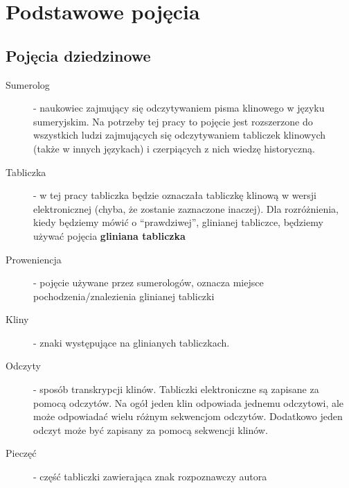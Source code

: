 \chapter{Podstawowe pojęcia}\label{r:pojecia}
\section{Pojęcia dziedzinowe}
\begin{description}
 \item[Sumerolog] - naukowiec zajmujący się odczytywaniem pisma klinowego w języku sumeryjskim. Na potrzeby tej pracy
		      to pojęcie jest rozszerzone do wszystkich ludzi zajmujących się odczytywaniem tabliczek klinowych (także w innych językach) i czerpiących z nich wiedzę historyczną.
 \item[Tabliczka] - w tej pracy tabliczka będzie oznaczała tabliczkę klinową w wersji elektronicznej 
		  (chyba, że zostanie zaznaczone inaczej). Dla rozróżnienia, kiedy będziemy mówić o ``prawdziwej'', 
		  glinianej tabliczce, będziemy używać pojęcia \textbf{gliniana tabliczka}
 \item[Proweniencja] - pojęcie używane przez sumerologów, oznacza miejsce pochodzenia/znalezienia glinianej tabliczki
 \item[Kliny] - znaki występujące na glinianych tabliczkach.
 \item[Odczyty] - sposób transkrypcji klinów. Tabliczki elektroniczne są zapisane za pomocą odczytów. 
Na ogół jeden klin odpowiada jednemu odczytowi, ale może odpowiadać wielu różnym sekwencjom odczytów. 
Dodatkowo jeden odczyt może być zapisany za pomocą sekwencji klinów.
 \item[Pieczęć] - część tabliczki zawierająca znak rozpoznawczy autora
\end{description}

